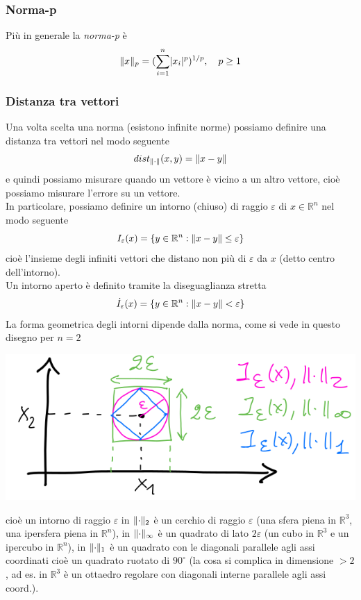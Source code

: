\subsubsection{Norma-p}
Più in generale la \textit{norma-p} è
\[
\lVert x\rVert_p = (\sum_{i=1}^n \lvert x_i\rvert^p)^{1/p}, \quad p \ge 1
\]

\subsubsection{Distanza tra vettori}
Una volta scelta una norma (esistono infinite norme) possiamo definire una distanza tra vettori nel modo seguente
\[
dist_{\lVert\cdot\rVert} (x,y) = \lVert x-y\rVert
\]
e quindi possiamo misurare quando un vettore è vicino a un altro vettore, cioè possiamo misurare l'errore su un vettore.\\
In particolare, possiamo definire un intorno (chiuso) di raggio $\varepsilon$ di $x \in \mathbb{R}^n$ nel modo seguente
\begin{equation*}
    I_\varepsilon(x)=\left\{ y \in \mathbb{R}^n : \lVert x-y\rVert \leq \varepsilon \right\}
\end{equation*}
cioè l'insieme degli infiniti vettori che distano non più di $\varepsilon$ da $x$ (detto centro dell'intorno). \\
Un intorno aperto è definito tramite la diseguaglianza stretta 
\begin{equation*}
    \Dot{I}_\varepsilon (x) = \left\{ y \in \mathbb{R}^n : \lVert x-y\rVert<\varepsilon \right\}
\end{equation*}
La forma geometrica degli intorni dipende dalla norma, come si vede in questo disegno per $n=2$
\begin{center}
    \includegraphics[scale=0.5]{foto/pag14}    
\end{center}
cioè un intorno di raggio $\varepsilon$ in $\lVert\cdot\rVert_2$ è un cerchio di raggio $\varepsilon$ (una sfera piena in $\mathbb{R}^3$, una ipersfera piena in $\mathbb{R}^n$), in $\lVert\cdot\rVert_\infty$ è un quadrato di lato $2\varepsilon$ (un cubo in $\mathbb{R}^3$ e un ipercubo in $\mathbb{R}^n$), in $\lVert\cdot\rVert_1$ è un quadrato con le diagonali parallele agli assi coordinati cioè un quadrato ruotato di $90^\circ$ (la cosa si complica in dimensione $>2$, ad es. in $\mathbb{R}^3$ è un ottaedro regolare con diagonali interne parallele agli assi coord.). \\
